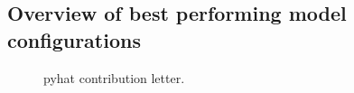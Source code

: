 \FloatBarrier

\clearpage

\subsection{Overview of best performing model configurations}\label{subsec:best_model_configurations}









\FloatBarrier

\begin{figure}
    \centering
    
    \caption{\gls{pyhat} contribution letter.}
    \label{fig:pyhat_contribution_letter}
\end{figure}